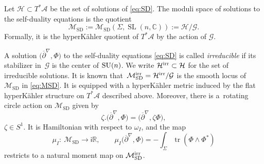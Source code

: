\documentclass[pdftex]{sigma}
\numberwithin{equation}{section}
\theoremstyle{definition}
\newcommand\C{{\mathbb C}}
\newcommand{\R}{{\mathbb R}}
\renewcommand{\i}{\mathsf{i}}
\begin{document}
Let $\mathcal H \subset T^*\mathcal A$ be the set of solutions of \eqref{eq:SD}. The moduli space of solutions to the self-duality equations is the quotient
\begin{equation}\label{eq:MSD}
\mathcal{M}_{\mathrm{SD}} := \mathcal{M}_{\mathrm{SD}}(\Sigma, \operatorname{SL}(n,\C)) := \mathcal H/\mathcal G .
\end{equation}
Formally, it is the hyperK\"ahler quotient of $T^*\mathcal A$ by the action of $\mathcal G$.

A solution $\bigl(\overline{\partial}^\nabla, \Phi\bigr)$ to the self-duality equations \eqref{eq:SD}
is called \emph{irreducible} if its stabilizer in~$\mathcal G$ is the center of
${\rm SU}(n)$. We write $\mathcal H^{\rm irr} \subset \mathcal{H}$ for the set of irreducible
solutions. It is known that~$
\mathcal{M}_{\mathrm{SD}}^{\rm irr} = \mathcal H^{\rm irr}/\mathcal G
$
is the smooth locus of $\mathcal{M}_{\mathrm{SD}}$ in \eqref{eq:MSD}. It is equipped with a hyperK\"ahler metric induced
by the flat hyperK\"ahler structure on $T^*\mathcal A$ described above. Moreover,
there is a~rotating circle action on $\mathcal{M}_{\mathrm{SD}}$ given by
\begin{equation}\label{eq:S1Msd}
\zeta.\bigl(\overline{\partial}^\nabla, \Phi\bigr) = \bigl(\overline{\partial}^\nabla, \zeta\Phi\bigr),
\end{equation}
$\zeta \in S^1$. It is Hamiltonian with respect to $\omega_I$, and the map
\begin{equation}\label{eq:muI}
\mu_I \colon\ \mathcal{M}_{\mathrm{SD}} \longrightarrow
\i \R, \qquad \mu_I\bigl(\overline{\partial}^\nabla, \Phi\bigr) = - \int_\Sigma\operatorname{tr}(\Phi\wedge\Phi^*)
\end{equation}
restricts to a natural moment map on $\mathcal{M}_{\mathrm{SD}}^{\rm irr}$.
\end{document}
